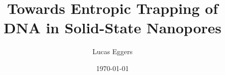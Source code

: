 \documentclass[aps,prl,preprint,groupedaddress]{revtex4}
\begin{document}

\title{Towards Entropic Trapping of DNA in Solid-State Nanopores}


\author{Lucas Eggers}


\date{\today}

\begin{abstract}
\end{abstract}

\pacs{}

\maketitle

\tableofcontents
\newpage

\end{document}
